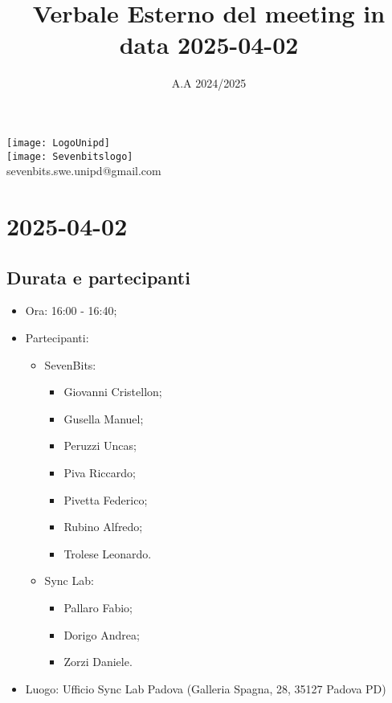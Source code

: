 \documentclass[10pt]{article}
\title{Verbale Esterno del meeting in data 2025-04-02} %
\date{A.A 2024/2025}
\begin{document}
\maketitle
\center 
\texttt{[image: LogoUnipd]}\\
\texttt{[image: Sevenbitslogo]}\\
sevenbits.swe.unipd@gmail.com\\
\vspace{2mm}

\newpage
\raggedright
\tableofcontents

\newpage
\section{2025-04-02} %
\subsection{Durata e partecipanti}
\begin{itemize}
\item Ora: 16:00 - 16:40; %
\item Partecipanti: 	
	\begin{itemize}
            \item SevenBits:
            \begin{itemize}
                \item Giovanni Cristellon;
                \item Gusella Manuel;
                \item Peruzzi Uncas;
                \item Piva Riccardo;
                \item Pivetta Federico;
                \item Rubino Alfredo;
                \item Trolese Leonardo.
	    \end{itemize}
            \item Sync Lab:
            \begin{itemize}
                \item Pallaro Fabio;
                \item Dorigo Andrea;
                \item Zorzi Daniele.
	    \end{itemize}
	\end{itemize}
\item Luogo: Ufficio Sync Lab Padova (Galleria Spagna, 28, 35127 Padova PD)
\end{itemize}
\end{document}
